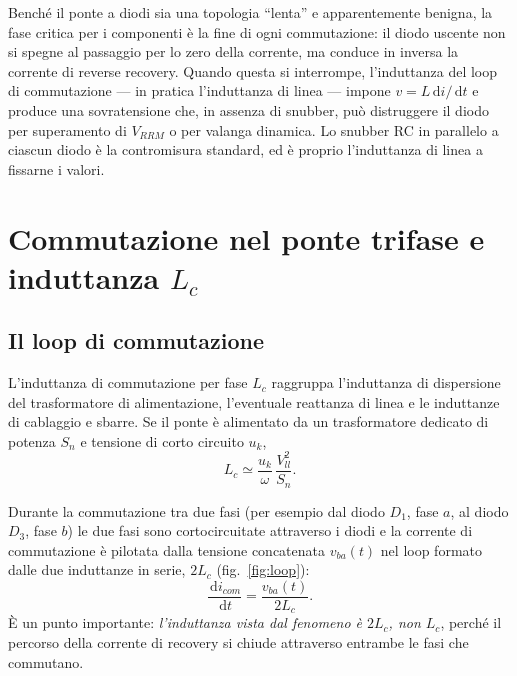 \documentclass[11pt,a4paper]{article}
\newcommand{\ud}{\,\mathrm{d}}
\begin{document}
Bench\'e il ponte a diodi sia una topologia ``lenta'' e apparentemente
benigna, la fase critica per i componenti \`e la fine di ogni
commutazione: il diodo uscente non si spegne al passaggio per lo zero
della corrente, ma conduce in inversa la corrente di reverse recovery.
Quando questa si interrompe, l'induttanza del loop di commutazione --- in
pratica l'induttanza di linea --- impone $v = L\ud i/\ud t$ e produce una
sovratensione che, in assenza di snubber, pu\`o distruggere il diodo per
superamento di $V_{RRM}$ o per valanga dinamica. Lo snubber RC in
parallelo a ciascun diodo \`e la contromisura standard, ed \`e proprio
l'induttanza di linea a fissarne i valori.

\section{Commutazione nel ponte trifase e induttanza $L_c$}
\label{sec:commutazione}

\subsection{Il loop di commutazione}

L'induttanza di commutazione per fase $L_c$ raggruppa l'induttanza di
dispersione del trasformatore di alimentazione, l'eventuale reattanza di
linea e le induttanze di cablaggio e sbarre. Se il ponte \`e alimentato da
un trasformatore dedicato di potenza $S_n$ e tensione di corto circuito
$u_k$,
\begin{equation}
L_c \simeq \frac{u_k}{\omega}\,\frac{V_{ll}^2}{S_n}.
\label{eq:Lc}
\end{equation}

Durante la commutazione tra due fasi (per esempio dal diodo $D_1$, fase
$a$, al diodo $D_3$, fase $b$) le due fasi sono cortocircuitate attraverso
i diodi e la corrente di commutazione \`e pilotata dalla tensione
concatenata $v_{ba}(t)$ nel loop formato dalle due induttanze in serie,
$2L_c$ (fig.~\ref{fig:loop}):
\begin{equation}
\frac{\ud i_{com}}{\ud t} = \frac{v_{ba}(t)}{2L_c}.
\label{eq:didt_generale}
\end{equation}
\`E un punto importante: \emph{l'induttanza vista dal fenomeno \`e $2L_c$,
non $L_c$}, perch\'e il percorso della corrente di recovery si chiude
attraverso entrambe le fasi che commutano.
\end{document}

